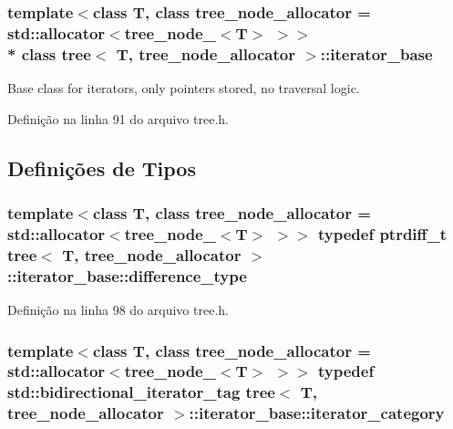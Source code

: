 \subsubsection*{template$<$class T, class tree\+\_\+node\+\_\+allocator = std\+::allocator$<$tree\+\_\+node\+\_\+$<$\+T$>$ $>$$>$\\*
class tree$<$ T, tree\+\_\+node\+\_\+allocator $>$\+::iterator\+\_\+base}

Base class for iterators, only pointers stored, no traversal logic. 

Definição na linha 91 do arquivo tree.\+h.



\subsection{Definições de Tipos}
\subsubsection[{difference\+\_\+type}]{\setlength{\rightskip}{0pt plus 5cm}template$<$class T, class tree\+\_\+node\+\_\+allocator = std\+::allocator$<$tree\+\_\+node\+\_\+$<$\+T$>$ $>$$>$ typedef ptrdiff\+\_\+t {\bf tree}$<$ T, tree\+\_\+node\+\_\+allocator $>$\+::{\bf iterator\+\_\+base\+::difference\+\_\+type}}\label{classtree_1_1iterator__base_aeff66472181aa05d50c7ffe4a91dc4c0}


Definição na linha 98 do arquivo tree.\+h.

\subsubsection[{iterator\+\_\+category}]{\setlength{\rightskip}{0pt plus 5cm}template$<$class T, class tree\+\_\+node\+\_\+allocator = std\+::allocator$<$tree\+\_\+node\+\_\+$<$\+T$>$ $>$$>$ typedef std\+::bidirectional\+\_\+iterator\+\_\+tag {\bf tree}$<$ T, tree\+\_\+node\+\_\+allocator $>$\+::{\bf iterator\+\_\+base\+::iterator\+\_\+category}}\label{classtree_1_1iterator__base_a7d0ace14418254eaab7526f1d0aabf40}


